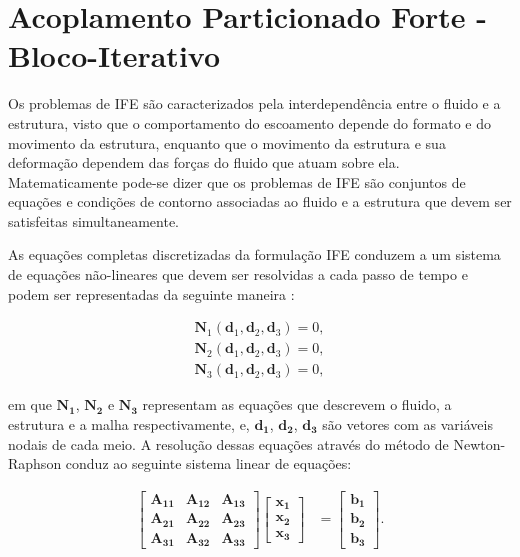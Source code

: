 \documentclass[tese_patricia]{subfiles}
\begin{document}
\section{Acoplamento Particionado Forte - Bloco-Iterativo}

Os problemas de IFE são caracterizados pela interdependência entre o fluido e a estrutura, visto que o comportamento do escoamento depende do formato e do movimento da estrutura, enquanto que o movimento da estrutura e sua deformação dependem das forças do fluido que atuam sobre ela. Matematicamente pode-se dizer que os problemas de IFE são conjuntos de equações e condições de contorno associadas ao fluido e a estrutura que devem ser satisfeitas simultaneamente.

As equações completas discretizadas da formulação IFE conduzem a um sistema de equações não-lineares que devem ser resolvidas a cada passo de tempo e podem ser representadas da seguinte maneira \cite{BazilevsTT:2013}:

\begin{align}
	\mathbf{N}_{1}\left(\mathbf{d}_{1},\mathbf{d}_{2},\mathbf{d}_{3}\right) = 0, \label{eq:N1}\\ 
	\mathbf{N}_{2}\left(\mathbf{d}_{1},\mathbf{d}_{2},\mathbf{d}_{3}\right) = 0,\label{eq:N2}\\
	\mathbf{N}_{3}\left(\mathbf{d}_{1},\mathbf{d}_{2},\mathbf{d}_{3}\right) = 0 \label{eq:N3},
\end{align}

\noindent em que $\mathbf{{N}_{1}}$, $\mathbf{{N}_{2}}$ e $\mathbf{{N}_{3}}$ representam as equações que descrevem o fluido, a estrutura e a malha respectivamente, e, $\mathbf{{d}_{1}}$, $\mathbf{{d}_{2}}$, $\mathbf{{d}_{3}}$ são vetores com as variáveis nodais de cada meio. 
A resolução dessas equações através do método de Newton-Raphson conduz ao seguinte sistema linear de equações:

\begin{align}
	\begin{bmatrix}
		\mathbf{A_{11}} & \mathbf{A_{12}} & \mathbf{A_{13}} \\
		\mathbf{A_{21}} & \mathbf{A_{22}} & \mathbf{A_{23}} \\
		\mathbf{A_{31}} & \mathbf{A_{32}} & \mathbf{A_{33}} 
	\end{bmatrix}
	\begin{bmatrix}
		\mathbf{x_{1}} \\
		\mathbf{x_{2}} \\
		\mathbf{x_{3}}
	\end{bmatrix}
	&=
	\begin{bmatrix}
		\mathbf{b_{1}} \\
		\mathbf{b_{2}} \\
		\mathbf{b_{3}}
	\end{bmatrix}.
	\label{eq:SistLinear}
\end{align}	
\end{document}
